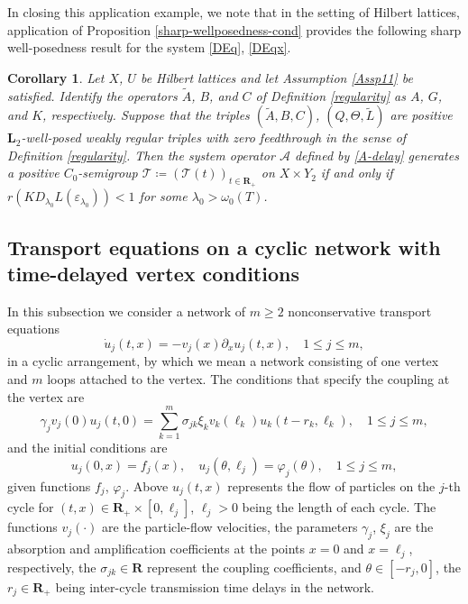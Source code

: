 \documentclass[a4paper,11pt,reqno]{amsart}
\def\calT{{\mathcal{T}}}
\def\calA{{\mathcal{A}}}
\def\R{\mathbf{R}}
\theoremstyle{plain}
\newtheorem{corollary}{Corollary}[section]
\numberwithin{equation}{section}
\begin{document}
In closing this application example, we note that in the setting of Hilbert lattices, application of Proposition \ref{sharp-wellposedness-cond} provides the following sharp well-posedness result for the system \eqref{DEq}, \eqref{DEqx}.
\begin{corollary}
Let $X$, $U$ be Hilbert lattices and let Assumption \ref{Assp11} be satisfied. Identify the operators $\tilde{A}$, $B$, and $C$ of Definition \ref{regularity} as $A$, $G$, and $K$, respectively. Suppose that the triples $(\tilde{A},B, C)$, $(Q,\Theta,\tilde{L})$ are positive $\bm{L}_2$-well-posed weakly regular triples with zero feedthrough in the sense of Definition \ref{regularity}. Then the system operator $\calA$ defined by \eqref{A-delay} generates a positive $C_0$-semigroup $\calT\coloneqq (\calT(t))_{t\in\R_+}$ on $X\times Y_2$ if and only if $r\left(KD_{\lambda_0}L(\varepsilon_{\lambda_0})\right)<1$ for some $\lambda_0>\omega_0(T)$.
\end{corollary}

\subsection{Transport equations on a cyclic network with time-delayed vertex conditions}

In this subsection we consider a network of $m\ge 2$ nonconservative transport equations
\begin{equation}\label{transport-equation}
\dot{u}_j(t,x)= -v_j(x)\partial_{x}u_j(t,x),\quad 1\le j\le m,
\end{equation}
in a cyclic arrangement, by which we mean a network consisting of one vertex and $m$ loops attached to the vertex. The conditions that specify the coupling at the vertex are
\begin{equation}\label{transport-equation2}
\gamma_jv_j(0)u_j(t,0)=\displaystyle\sum_{k=1}^{m}\sigma_{jk}\xi_kv_k(\ell_k)u_k(t-r_k,\ell_k),\quad 1\le j\le m,
\end{equation}
and the initial conditions are
\begin{equation}\label{transport-equation3}
u_j(0,x)= f_j(x),\quad u_j(\theta,\ell_j)=\varphi_j(\theta),\quad 1\le j\le m,
\end{equation}
given functions $f_j$, $\varphi_j$. Above ${u}_j(t,x)$ represents the flow of particles on the $j$-th cycle for $(t,x)\in \R_+\times[0,\ell_j]$, $\ell_j>0$ being the length of each cycle. The functions $v_j(\cdot)$ are the particle-flow velocities, the parameters $\gamma_j$, $\xi_j$ are the absorption and amplification coefficients at the points $x=0$ and $x=\ell_j$, respectively, the $\sigma_{jk}\in \R$ represent the coupling coefficients, and $\theta\in[-r_j,0]$, the $r_j\in \R_+$ being inter-cycle transmission time delays in the network.
\end{document}
